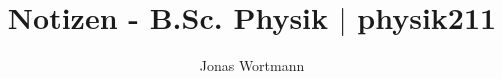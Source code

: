 \documentclass[a4paper,12pt]{article}
\begin{document}

\title{Notizen - B.Sc. Physik $|$ physik211}
\author{Jonas Wortmann}
\maketitle
{}


\newpage


\fancyhead[L]{\thepage}
\fancyfoot[C]{}

\tableofcontents


\newpage


\fancyhead[R]{\leftmark\\\rightmark}
\end{document}
